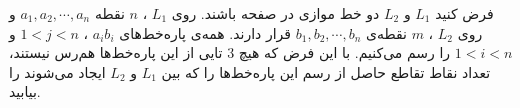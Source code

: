 \EXERCISE
فرض کنید
$L_1$
و
$L_2$
دو خط موازی در صفحه باشند. روی
$L_1$
،
$n$
نقطه
$a_1, a_2, \cdots, a_n$
و روی
$L_2$
،
$m$
نقطه‌ی
$b_1, b_2, \cdots, b_n$
قرار دارند. همه‌ی پاره‌خط‌های
$a_ib_i$
،
$1 < j < n$
و
$1 < i < n$
را رسم می‌کنیم. با این فرض که هیچ
$3$
تایی از این پاره‌خط‌ها هم‌رس نیستند، تعداد نقاط تقاطع حاصل از رسم این پاره‌خط‌ها را که بین
$L_1$
و
$L_2$
ایجاد می‌شوند را بیابید.